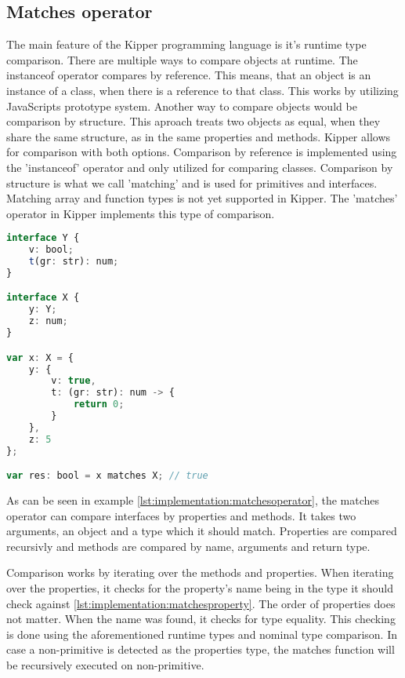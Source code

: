 \subsection{Matches operator}
\label{subsec:matches}

The main feature of the Kipper programming language is it's runtime type comparison. There are multiple ways to compare objects at runtime. The instanceof operator compares by reference. This means, that an object is an instance of a class, when there is a reference to that class. This works by utilizing JavaScripts prototype system. Another way to compare objects would be comparison by structure. This aproach treats two objects as equal, when they share the same structure, as in the same properties and methods. Kipper allows for comparison with both options. Comparison by reference is implemented using the 'instanceof' operator and only utilized for comparing classes. Comparison by structure is what we call 'matching' and is used for primitives and interfaces. Matching array and function types is not yet supported in Kipper. The 'matches' operator in Kipper implements this type of comparison.

\begin{lstlisting}[language=Typescript,caption=The Kipper matches operator,label=lst:implementation:matchesoperator]
interface Y {
	v: bool;
	t(gr: str): num;
}

interface X {
	y: Y;
	z: num;
}

var x: X = {
	y: {
		v: true,
		t: (gr: str): num -> {
			return 0;
		}
	},
	z: 5
};

var res: bool = x matches X; // true
\end{lstlisting}

As can be seen in example \ref{lst:implementation:matchesoperator}, the matches operator can compare interfaces by properties and methods. It takes two arguments, an object and a type which it should match. Properties are compared recursivly and methods are compared by name, arguments and return type.

Comparison works by iterating over the methods and properties. When iterating over the properties, it checks for the property's name being in the type it should check against \ref{lst:implementation:matchesproperty}. The order of properties does not matter. When the name was found, it checks for type equality. This checking is done using the aforementioned runtime types and nominal type comparison. In case a non-primitive is detected as the properties type, the matches function will be recursively executed on non-primitive.

